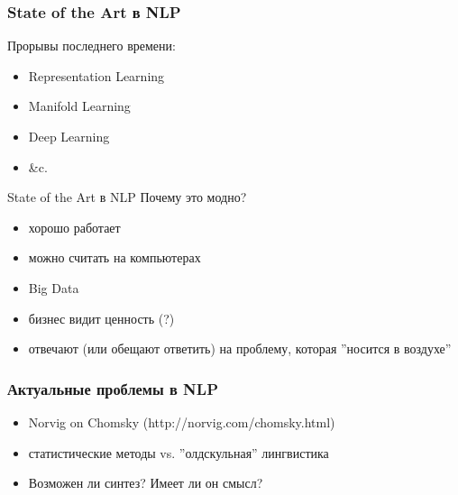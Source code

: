 \documentclass{beamer}
\begin{document}
\begin{frame}[fragile]
\frametitle{State of the Art в NLP}
Прорывы последнего времени:\bigskip
\begin{itemize}
  \item Representation Learning
  \item Manifold Learning
  \item Deep Learning
  \item \&c.
\end{itemize}
\end{frame}

\begin{frame}{State of the Art в NLP}
Почему это модно?\bigskip
\begin{itemize}
  \item хорошо работает
  \item можно считать на компьютерах
  \item Big Data
  \item бизнес видит ценность (?) 
  \item отвечают (или обещают ответить) на проблему, которая ''носится в воздухе'' 
\end{itemize}
\end{frame}

\begin{frame}[fragile]
\frametitle{Актуальные проблемы в NLP}
\begin{itemize}
  \item Norvig on Chomsky (http://norvig.com/chomsky.html) 
  \item статистические методы vs. ''олдскульная'' лингвистика 
  \item Возможен ли синтез? Имеет ли он смысл?
\end{itemize}
\end{frame}
\end{document}
